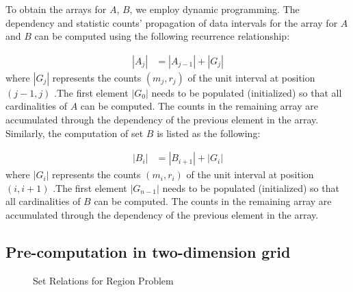 \documentclass[AMA,LATO1COL]{WileyNJD-v2}
\begin{document}
To obtain the arrays for $A$, $B$, we employ dynamic programming. The dependency and statistic counts' propagation of data intervals for the array for $A$ and $B$ can be computed using the following recurrence relationship:

\begin{eqnarray}
|A_j|  &=  |A_{j-1}|  + |G_j|
\end{eqnarray}
\normalsize
where $|G_j|$ represents the counts $(m_j,r_j)$ of the unit interval at position $(j-1,j)$ .The first element $|G_0|$ needs to be populated (initialized) so that
all cardinalities of $A$ can be computed. The counts in the remaining array are accumulated through the dependency of the previous element in the array.\\
Similarly, the computation of set $B$ is listed as the following:

\begin{eqnarray}
|B_i|  &=  |B_{i+1}|  + |G_i|
\end{eqnarray}
where $|G_i|$ represents the counts $(m_i,r_i)$ of the unit interval at position $(i,i+1)$ .The first element $|G_{n-1}|$ needs to be populated (initialized) so that
all cardinalities of $B$ can be computed. The counts in the remaining array are accumulated through the dependency of the previous element in the array.\\


\subsection{Pre-computation in two-dimension grid}
\begin{figure}[h]
     \begin{center}
\end{center}
\vspace{-10pt}
\caption{Set Relations for Region Problem}\label{fig:example}
\end{figure}
\end{document}
